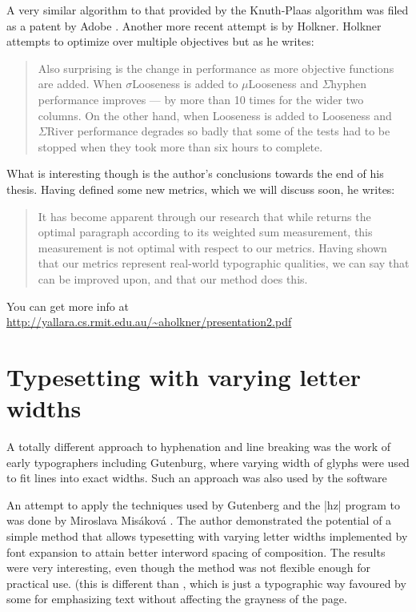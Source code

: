 {{A very similar algorithm to that provided by the Knuth-Plaas algorithm was filed as a patent
by Adobe \cite{adobepatent}. Another more recent attempt is by Holkner\cite{Holkner2006}. Holkner attempts to optimize over multiple objectives but as he writes:

\begin{quote}
Also surprising is the change in performance as more objective functions are added. When
$\sigma$Looseness is added to $\mu$Looseness and $\Sigma\text{hyphen}$ performance improves --- by more than 10 times
for the wider two columns. On the other hand, when Looseness is added to Looseness and $\Sigma\text{River}$
performance degrades so badly that some of the tests had to be stopped when they took more than six
hours to complete.

\end{quote}

What is interesting though is the author's conclusions towards the end of his thesis. Having defined some new metrics, which we will discuss soon, he writes:

\begin{quote}
It has become apparent through our research that while \tex returns the optimal paragraph according
to its weighted sum measurement, this measurement is not optimal with respect to our metrics.
Having shown that our metrics represent real-world typographic qualities, we can say that \tex can be
improved upon, and that our method does this.

\end{quote}

You can get more info at \url{http://yallara.cs.rmit.edu.au/~aholkner/presentation2.pdf}


\section{Typesetting with varying letter widths}
A totally different approach to hyphenation and line breaking was the work of early typographers including
Gutenburg, where varying width of glyphs were used to fit lines into exact widths. Such an approach was
also used by the  software\cite{hz}

An attempt to apply the techniques used by Gutenberg and the |hz| program to 
was done by Miroslava Mis\'akov\'a \cite{Miroslava1998}. The author demonstrated the potential of a simple
method that allows typesetting with varying letter widths implemented by font expansion
to attain better interword spacing of composition. The results were very interesting,
even though the method was not flexible enough for practical use. (this is different than , which
is just a typographic way favoured by some for emphasizing text without affecting the grayness of the page.

}}

